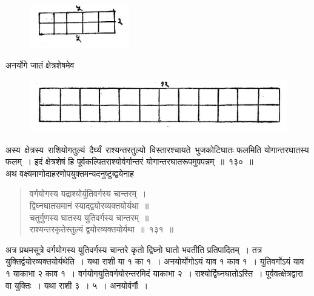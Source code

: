 \documentclass[11pt, openany]{book}
\makeatletter
\newcommand{\devanagarinumeral}[1]{%
 \devanagaridigits{\number\csname c@#1\endcsname}}
\makeatother
\begin{document}
\begin{figure}[h!]
    \centering
    \includegraphics[scale=0.6]{graphics/Capture5.png}
\end{figure}
\vspace{-2mm}

\noindent अनर्योगे जातं क्षेत्रशेषमेव 

\begin{figure}[h!]
    \centering
    \includegraphics[scale=0.5]{graphics/Capture4.png}
\end{figure}
\newpage
\fancyhead[LE,RO]{\thepage}
\cfoot{}
\renewcommand{\thepage}{\devanagarinumeral{page}}
\setcounter{page}{176}
\s\onehalfspacing

 अस्य \,क्षेत्रस्य \,राशियोगतुल्यं \,दैर्घ्यं \,राश्यन्तरतुल्यो \,विस्तारश्चायते \,भुजकोटिघातः 
फलमिति योगान्तरघातस्य फलम्~। इदं क्षेत्रशेषं हि
पूर्वकल्पितराश्योर्वर्गान्तरं 
योगान्तरघातरूपमुपपन्नम्~॥~१३०~॥~\\

\vspace{-2mm}
 अथ वक्ष्यमाणोदाहरणोपयुक्तमन्यदनुष्टुब्द्वयेनाह\textendash

 \label{131}
\begin{quote}
    \eg 
    वर्गयोगस्य यद्राश्योर्युतिवर्गस्य चान्तरम्~। \\
 द्विघ्नघातसमानं स्याद्द्वयोरव्यक्तयोर्यथा~॥~\\
 चतुर्गुणस्य घातस्य युतिवर्गस्य चान्तरम्~॥~\\
 राश्यन्तरकृतेस्तुल्यं द्वयोरव्यक्तयोर्यथा~॥~१३१~॥~
\end{quote}
 
 अत्र प्रथमसूत्रे वर्गयोगस्य युतिवर्गस्य चान्तरे कृतो द्विघ्नो घातो
भवतीति 
प्रतिपादितम्~। तत्र युक्तिर्द्वयोरव्यक्तयोर्यथेति~। यथा राशी या १ का १~। अनयोर्योगोऽयं याव १ काव १~। युतिवर्गोऽयं याव १ याकाभा २ काव १~।
वर्गयोगयुतिवर्गयोरन्तरमिदं याकाभा २~। राश्योर्द्विघ्नघातोऽस्ति~। पूर्ववत्क्षेत्रद्वारा
वा युक्तिः~। यथा 
राशी ३~। ५~। अनयोर्वर्गौ~। \\
\end{document}
